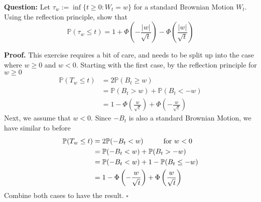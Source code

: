 \documentclass{article}
\begin{document}
\begin{tcolorbox}[colframe=black,colback=gray!5,boxrule=0.5pt]
\textbf{Question:} Let $\tau_w :=\inf\{t\geq 0 : W_t=w\}$ for a standard Brownian Motion $W_t$. Using the reflection principle, show that 
$$\mathbb{P}(\tau_w\leq t) = 1 + \Phi\left(-\frac{|w|}{\sqrt{t}}\right) - \Phi\left(\frac{|w|}{\sqrt{t}}\right)$$
\end{tcolorbox}
\textbf{Proof.} This exercise requires a bit of care, and needs to be split up into the case where $w\geq0$ and $w<0$. Starting with the first case, by the reflection principle for $w\geq0$
\begin{align*}
    \mathbb{P}(T_w\leq t) &= 2\mathbb{P}(B_t\geq w)  \\
    &= \mathbb{P}(B_t > w) + \mathbb{P}(B_t < -w) \\
    &= 1 - \Phi\left(\frac{w}{\sqrt{t}}\right) + \Phi\left(-\frac{w}{\sqrt{t}}\right)
\end{align*}
Next, we assume that $w < 0$. Since $-B_t$ is also a standard Brownian Motion, we have similar to before 
\begin{align*}
    \mathbb{P}(T_w\leq t)&= 2\mathbb{P}(-B_t<w) \hspace{10mm} \text{for $w<0$} \\
    &= \mathbb{P}(-B_t<w) + \mathbb{P}(B_t > -w) \\
    &= \mathbb{P}(-B_t<w) + 1-\mathbb{P}(B_t\leq-w) \\
    &= 1-\Phi\left(-\frac{w}{\sqrt{t}}\right)+\Phi\left(\frac{w}{\sqrt{t}}\right)
\end{align*}
Combine both cases to have the result. $\square$
\end{document}
